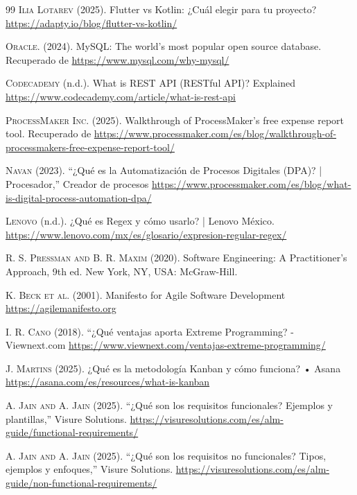\begin{thebibliography}{99}
\textsc{Ilia Lotarev} (2025). Flutter vs Kotlin: ¿Cuál elegir para tu proyecto?
\url{https://adapty.io/blog/flutter-vs-kotlin/}

\textsc{Oracle.} (2024). MySQL: The world's most popular open source database. Recuperado de \url{https://www.mysql.com/why-mysql/}

\textsc{Codecademy} (n.d.). What is REST API (RESTful API)? Explained
\url{https://www.codecademy.com/article/what-is-rest-api}

\textsc{ProcessMaker Inc.} (2025). Walkthrough of ProcessMaker's free expense report tool. Recuperado de \url{https://www.processmaker.com/es/blog/walkthrough-of-processmakers-free-expense-report-tool/}

\textsc{Navan} (2023). “¿Qué es la Automatización de Procesos Digitales (DPA)? | Procesador,” Creador de procesos
\url{https://www.processmaker.com/es/blog/what-is-digital-process-automation-dpa/}

\textsc{Lenovo} (n.d.). ¿Qué es Regex y cómo usarlo? | Lenovo México.
\url{https://www.lenovo.com/mx/es/glosario/expresion-regular-regex/}

\textsc{R. S. Pressman and B. R. Maxim} (2020). Software Engineering: A Practitioner’s Approach, 9th ed. New York, NY, USA: McGraw-Hill.
\url{}

\textsc{K. Beck et al.} (2001). Manifesto for Agile Software Development
\url{https://agilemanifesto.org}

\textsc{I. R. Cano} (2018). “¿Qué ventajas aporta Extreme Programming? - Viewnext.com
\url{https://www.viewnext.com/ventajas-extreme-programming/}

\textsc{J. Martins} (2025). ¿Qué es la metodología Kanban y cómo funciona? • Asana
\url{https://asana.com/es/resources/what-is-kanban}


\textsc{A. Jain and A. Jain} (2025). “¿Qué son los requisitos funcionales? Ejemplos y plantillas,” Visure Solutions.
\url{https://visuresolutions.com/es/alm-guide/functional-requirements/}

\textsc{A. Jain and A. Jain} (2025). “¿Qué son los requisitos no funcionales? Tipos, ejemplos y enfoques,” Visure Solutions.
\url{https://visuresolutions.com/es/alm-guide/non-functional-requirements/}


\end{thebibliography}
